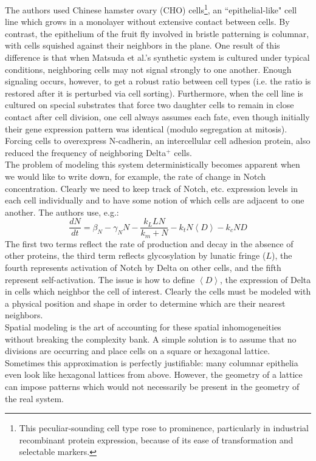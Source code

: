 \documentclass{article}
\begin{document}
The authors used Chinese hamster ovary (CHO) cells\footnote{This peculiar-sounding cell type rose to prominence, particularly in industrial recombinant protein expression, because of its ease of transformation and selectable markers.}, an ``epithelial-like" cell line which grows in a monolayer without extensive contact between cells. By contrast, the epithelium of the fruit fly involved in bristle patterning is columnar, with cells squished against their neighbors in the plane. One result of this difference is that when Matsuda et al.'s synthetic system is cultured under typical conditions, neighboring cells may not signal strongly to one another. Enough signaling occurs, however, to get a robust ratio between cell types (i.e. the ratio is restored after it is perturbed via cell sorting). Furthermore, when the cell line is cultured on special substrates that force two daughter cells to remain in close contact after cell division, one cell always assumes each fate, even though initially their gene expression pattern was identical (modulo segregation at mitosis). Forcing cells to overexpress N-cadherin, an intercellular cell adhesion protein, also reduced the frequency of neighboring Delta$^+$ cells.\\

The problem of modeling this system deterministically becomes apparent when we would like to write down, for example, the rate of change in Notch concentration. Clearly we need to keep track of Notch, etc. expression levels in each cell individually and to have some notion of which cells are adjacent to one another. The authors use, e.g.:
\[ \frac{dN}{dt} = \beta_N - \gamma_N N - \frac{k_L L N}{k_m + N} - k_t N \left< D \right> - k_c N D \]
The first two terms reflect the rate of production and decay in the absence of other proteins, the third term reflects glycosylation by lunatic fringe ($L$), the fourth represents activation of Notch by Delta on other cells, and the fifth represent self-activation. The issue is how to define $\left< D \right>$, the expression of Delta in cells which neighbor the cell of interest. Clearly the cells must be modeled with a physical position and shape in order to determine which are their nearest neighbors.\\

Spatial modeling is the art of accounting for these spatial inhomogeneities without breaking the complexity bank. A simple solution is to assume that no divisions are occurring and place cells on a square or hexagonal lattice. Sometimes this approximation is perfectly justifiable: many columnar epithelia even look like hexagonal lattices from above. However, the geometry of a lattice can impose patterns which would not necessarily be present in the geometry of the real system.\\
\end{document}
